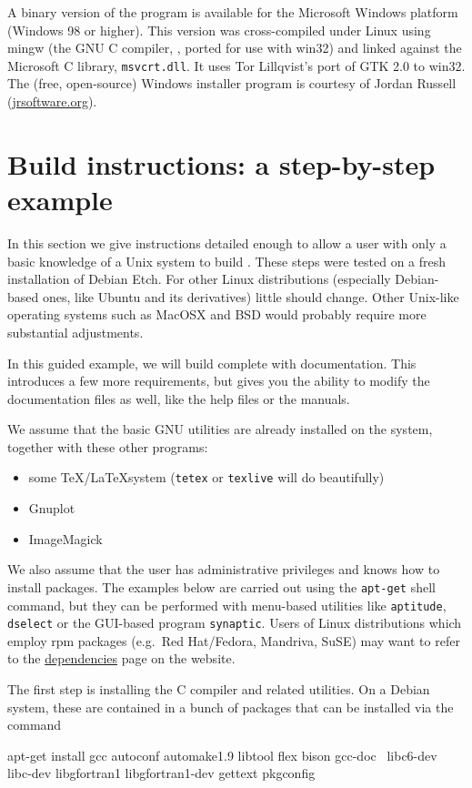 A binary version of the program is available for the Microsoft Windows
platform (Windows 98 or higher). This version was cross-compiled under
Linux using mingw (the GNU C compiler, , ported for use with
win32) and linked against the Microsoft C library, \verb+msvcrt.dll+.
It uses Tor Lillqvist's port of GTK 2.0 to win32.  The (free,
open-source) Windows installer program is courtesy of Jordan Russell
(\href{http://www.jrsoftware.org/}{jrsoftware.org}).

\section{Build instructions: a step-by-step example}
\label{sec:build-inst}

In this section we give instructions detailed enough to allow a user
with only a basic knowledge of a Unix system to build .
These steps were tested on a fresh installation of Debian Etch. For
other Linux distributions (especially Debian-based ones, like Ubuntu
and its derivatives) little should change. Other Unix-like operating
systems such as MacOSX and BSD would probably require more substantial
adjustments.

In this guided example, we will build  complete with
documentation.  This introduces a few more requirements, but gives you
the ability to modify the documentation files as well, like the help
files or the manuals.

We assume that the basic GNU utilities are already installed on the
system, together with these other programs:
\begin{itemize}
\item some \TeX/\LaTeX system (\texttt{tetex} or \texttt{texlive} will
  do beautifully)
\item Gnuplot
\item ImageMagick
\end{itemize}
We also assume that the user has administrative privileges and knows
how to install packages.  The examples below are carried out using the
\texttt{apt-get} shell command, but they can be performed with
menu-based utilities like \texttt{aptitude}, \texttt{dselect} or the
GUI-based program \texttt{synaptic}. Users of Linux distributions
which employ rpm packages (e.g.\ Red Hat/Fedora, Mandriva, SuSE) may
want to refer to the
\href{http://gretl.sourceforge.net/depend.html}{dependencies} page on
the  website.

The first step is installing the C compiler and related utilities. On
a Debian system, these are contained in a bunch of packages that can
be installed via the command
\begin{code}
apt-get install gcc autoconf automake1.9 libtool flex bison gcc-doc \
libc6-dev libc-dev libgfortran1 libgfortran1-dev gettext pkgconfig
\end{code}

